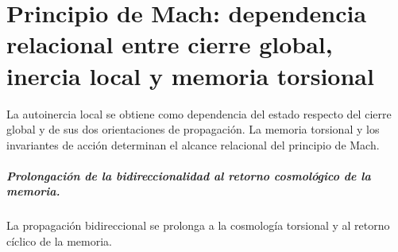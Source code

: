 \chapter{Principio de Mach: dependencia relacional entre cierre global, inercia local y memoria torsional}
\label{chap:parte-iv-70}

La autoinercia local se obtiene como dependencia del estado respecto del cierre global y de sus dos orientaciones de propagación. La memoria torsional y los invariantes de acción determinan el alcance relacional del principio de Mach.



\paragraph{Prolongación de la bidireccionalidad al retorno cosmológico de la memoria.} La propagación bidireccional se prolonga a la cosmología torsional y al retorno cíclico de la memoria.
